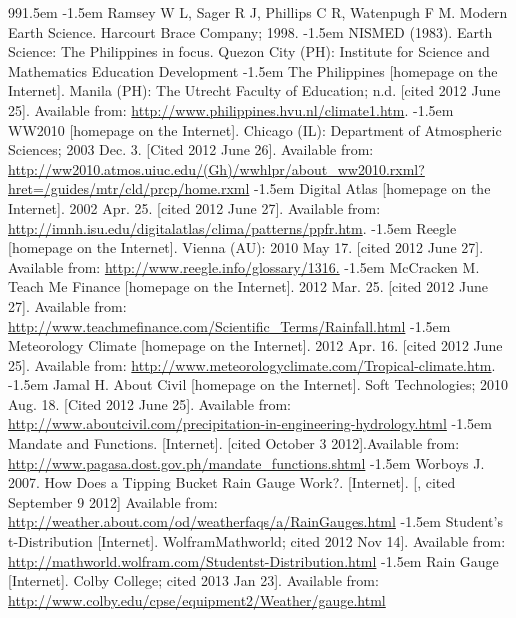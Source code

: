 \def\bibindent{1.5em}
\begin{thebibliography}{99\kern\bibindent}
\makeatletter
\let\old@biblabel\@biblabel
\def\@biblabel#1{\old@biblabel{#1}\kern\bibindent}
\let\old@bibitem\bibitem
\def\bibitem#1{\old@bibitem{#1}\leavevmode\kern-\bibindent}
\renewcommand\@biblabel[1]{}
\setlength{\parskip}{0pt}
\setlength{\itemsep}{0pt plus 0.3ex}
\makeatother
{} Ramsey W L, Sager R J, Phillips C R, Watenpugh F M. Modern Earth Science. Harcourt Brace Company; 1998.
 NISMED (1983). Earth Science: The Philippines in focus. Quezon City (PH): Institute for Science and Mathematics Education Development
 The Philippines [homepage on the Internet]. Manila (PH): The Utrecht Faculty of Education; n.d. [cited 2012 June 25]. Available from: \url{http://www.philippines.hvu.nl/climate1.htm}.
 WW2010 [homepage on the Internet]. Chicago (IL): Department of Atmospheric Sciences; 2003 Dec. 3. [Cited 2012 June 26]. Available from: \url{http://ww2010.atmos.uiuc.edu/(Gh)/wwhlpr/about_ww2010.rxml?hret=/guides/mtr/cld/prcp/home.rxml}
 Digital Atlas [homepage on the Internet]. 2002 Apr. 25. [cited 2012 June 27]. Available from: \url{http://imnh.isu.edu/digitalatlas/clima/patterns/ppfr.htm}.
 Reegle [homepage on the Internet]. Vienna (AU): 2010 May 17. [cited 2012 June 27]. Available from: \url{http://www.reegle.info/glossary/1316.}
 McCracken M. Teach Me Finance [homepage on the Internet]. 2012 Mar. 25. [cited 2012 June 27]. Available from: \url{ http://www.teachmefinance.com/Scientific_Terms/Rainfall.html}
 Meteorology Climate [homepage on the Internet]. 2012 Apr. 16. [cited 2012 June 25]. Available from: \url{http://www.meteorologyclimate.com/Tropical-climate.htm}.
 Jamal H. About Civil [homepage on the Internet]. Soft Technologies; 2010 Aug. 18. [Cited 2012 June 25]. Available from: \url{http://www.aboutcivil.com/precipitation-in-engineering-hydrology.html}
 Mandate and Functions. [Internet]. [cited October 3 2012].Available from:  \url{http://www.pagasa.dost.gov.ph/mandate_functions.shtml}
 Worboys J. 2007. How Does a Tipping Bucket Rain Gauge Work?. [Internet]. [, cited September 9 2012] Available from: \url{ http://weather.about.com/od/weatherfaqs/a/RainGauges.html}
 Student's t-Distribution [Internet]. WolframMathworld; cited 2012 Nov 14]. Available from: \url{http://mathworld.wolfram.com/Studentst-Distribution.html}
 Rain Gauge [Internet]. Colby College; cited 2013 Jan 23]. Available from: \url{ http://www.colby.edu/cpse/equipment2/Weather/gauge.html}

\end{thebibliography}
